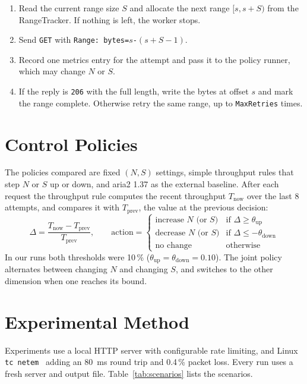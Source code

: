 \documentclass[11pt,a4paper]{report}
\newcommand{\code}[1]{\texttt{#1}}
\begin{document}
\begin{enumerate}
\item Read the current range size $S$ and allocate the next range $[s, s+S)$ from the RangeTracker. If nothing is left, the worker stops.
\item Send \code{GET} with \code{Range: bytes=$s$-$(s+S-1)$}.
\item Record one metrics entry for the attempt and pass it to the policy runner, which may change $N$ or $S$.
\item If the reply is \code{206} with the full length, write the bytes at offset $s$ and mark the range complete. Otherwise retry the same range, up to \code{MaxRetries} times.
\end{enumerate}

\section{Control Policies}
The policies compared are fixed $(N, S)$ settings, simple throughput rules that step $N$ or $S$ up or down, and aria2 1.37 as the external baseline. After each request the throughput rule computes the recent throughput $T_{\text{now}}$ over the last 8 attempts, and compares it with $T_{\text{prev}}$, the value at the previous decision:
\begin{equation}
\Delta = \frac{T_{\text{now}} - T_{\text{prev}}}{T_{\text{prev}}}, \qquad
\text{action} =
\begin{cases}
\text{increase } N \text{ (or } S) & \text{if } \Delta \ge \theta_{\text{up}}\\
\text{decrease } N \text{ (or } S) & \text{if } \Delta \le -\theta_{\text{down}}\\
\text{no change} & \text{otherwise}
\end{cases}
\end{equation}
In our runs both thresholds were 10\,\% ($\theta_{\text{up}} = \theta_{\text{down}} = 0.10$). The joint policy alternates between changing $N$ and changing $S$, and switches to the other dimension when one reaches its bound.

\section{Experimental Method}
Experiments use a local HTTP server with configurable rate limiting, and Linux \code{tc netem}~\cite{netem} adding an 80~ms round trip and 0.4\,\% packet loss. Every run uses a fresh server and output file. Table~\ref{tab:scenarios} lists the scenarios.
\end{document}
